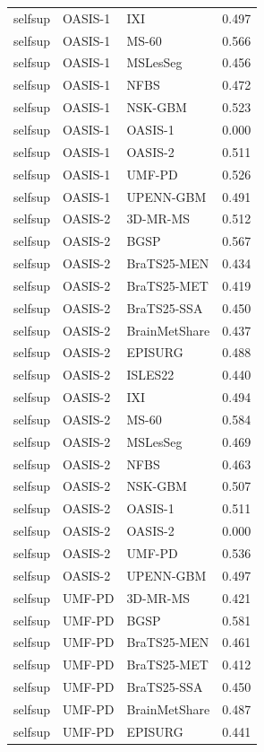 \begin{tabular}{lllr}
selfsup & OASIS-1 & IXI & 0.497 \\
selfsup & OASIS-1 & MS-60 & 0.566 \\
selfsup & OASIS-1 & MSLesSeg & 0.456 \\
selfsup & OASIS-1 & NFBS & 0.472 \\
selfsup & OASIS-1 & NSK-GBM & 0.523 \\
selfsup & OASIS-1 & OASIS-1 & 0.000 \\
selfsup & OASIS-1 & OASIS-2 & 0.511 \\
selfsup & OASIS-1 & UMF-PD & 0.526 \\
selfsup & OASIS-1 & UPENN-GBM & 0.491 \\
selfsup & OASIS-2 & 3D-MR-MS & 0.512 \\
selfsup & OASIS-2 & BGSP & 0.567 \\
selfsup & OASIS-2 & BraTS25-MEN & 0.434 \\
selfsup & OASIS-2 & BraTS25-MET & 0.419 \\
selfsup & OASIS-2 & BraTS25-SSA & 0.450 \\
selfsup & OASIS-2 & BrainMetShare & 0.437 \\
selfsup & OASIS-2 & EPISURG & 0.488 \\
selfsup & OASIS-2 & ISLES22 & 0.440 \\
selfsup & OASIS-2 & IXI & 0.494 \\
selfsup & OASIS-2 & MS-60 & 0.584 \\
selfsup & OASIS-2 & MSLesSeg & 0.469 \\
selfsup & OASIS-2 & NFBS & 0.463 \\
selfsup & OASIS-2 & NSK-GBM & 0.507 \\
selfsup & OASIS-2 & OASIS-1 & 0.511 \\
selfsup & OASIS-2 & OASIS-2 & 0.000 \\
selfsup & OASIS-2 & UMF-PD & 0.536 \\
selfsup & OASIS-2 & UPENN-GBM & 0.497 \\
selfsup & UMF-PD & 3D-MR-MS & 0.421 \\
selfsup & UMF-PD & BGSP & 0.581 \\
selfsup & UMF-PD & BraTS25-MEN & 0.461 \\
selfsup & UMF-PD & BraTS25-MET & 0.412 \\
selfsup & UMF-PD & BraTS25-SSA & 0.450 \\
selfsup & UMF-PD & BrainMetShare & 0.487 \\
selfsup & UMF-PD & EPISURG & 0.441 \\

\end{tabular}
